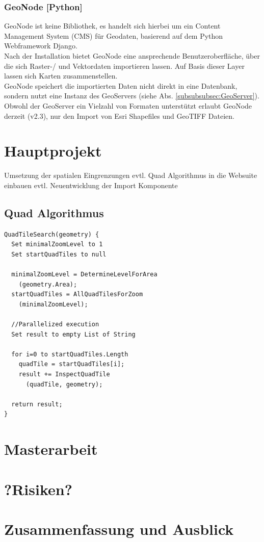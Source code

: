 \documentclass[10pt,conference,compsocconf]{IEEEtran}
\begin{document}
\subsubsection{GeoNode [Python]}
GeoNode ist keine Bibliothek, es handelt sich hierbei um ein Content Management System (CMS) für Geodaten, basierend auf dem Python Webframework Django.\\
Nach der Installation bietet GeoNode eine ansprechende Benutzeroberfläche, über die sich Raster-/ und Vektordaten importieren lassen. Auf Basis dieser Layer lassen sich Karten zusammenstellen.\\
GeoNode speichert die importierten Daten nicht direkt in eine Datenbank, sondern nutzt eine Instanz des GeoServers (siehe Abs. \ref{subsubsubsec:GeoServer}). Obwohl der GeoServer ein Vielzahl von Formaten unterstützt erlaubt GeoNode derzeit (v2.3), nur den Import von Esri Shapefiles und GeoTIFF Dateien.\\



\section{Hauptprojekt}
Umsetzung der spatialen Eingrenzungen
evtl. Quad Algorithmus in die Websuite einbauen
evtl. Neuentwicklung der Import Komponente


\subsection{Quad Algorithmus}
\lstset{language=[Sharp]C, frame=single}
\begin{lstlisting}
QuadTileSearch(geometry) { 
  Set minimalZoomLevel to 1 
  Set startQuadTiles to null 

  minimalZoomLevel = DetermineLevelForArea
    (geometry.Area);
  startQuadTiles = AllQuadTilesForZoom
    (minimalZoomLevel);
	
  //Parallelized execution
  Set result to empty List of String  

  for i=0 to startQuadTiles.Length 
    quadTile = startQuadTiles[i];
    result += InspectQuadTile
      (quadTile, geometry);
	
  return result; 
}	
\end{lstlisting}



\section{Masterarbeit}



\section{?Risiken?}



\section{Zusammenfassung und Ausblick}





\end{document}
